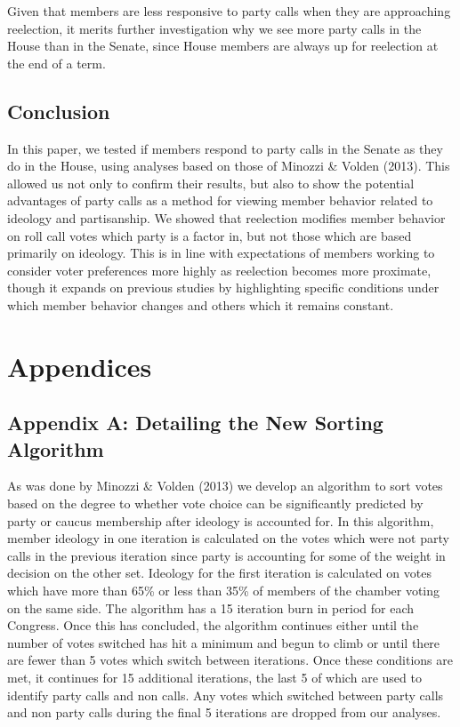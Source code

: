 \documentclass[12pt]{article}
\begin{document}
Given that members are less responsive to party calls when they are approaching reelection, it merits further investigation why we see more party calls in the House than in the Senate, since House members are always up for reelection at the end of a term. 



\subsection{Conclusion}

In this paper, we tested if members respond to party calls in the Senate as they do in the House, using analyses based on those of Minozzi \& Volden (2013). This allowed us not only to confirm their results, but also to show the potential advantages of party calls as a method for viewing member behavior related to ideology and partisanship. We showed that reelection modifies member behavior on roll call votes which party is a factor in, but not those which are based primarily on ideology. This is in line with expectations of members working to consider voter preferences more highly as reelection becomes more proximate, though it expands on previous studies by highlighting specific conditions under which member behavior changes and others which it remains constant.

\pagebreak

\section{Appendices}

\subsection{Appendix A: Detailing the New Sorting Algorithm}

As was done by Minozzi \& Volden (2013) we develop an algorithm to sort votes based on the degree to whether vote choice can be significantly predicted by party or caucus membership after ideology is accounted for. In this algorithm, member ideology in one iteration is calculated on the votes which were not party calls in the previous iteration since party is accounting for some of the weight in decision on the other set. Ideology for the first iteration is calculated on votes which have more than 65\% or less than 35\% of members of the chamber voting on the same side. The algorithm has a 15 iteration burn in period for each Congress. Once this has concluded, the algorithm continues either until the number of votes switched has hit a minimum and begun to climb or until there are fewer than 5 votes which switch between iterations. Once these conditions are met, it continues for 15 additional iterations, the last 5 of which are used to identify party calls and non calls. Any votes which switched between party calls and non party calls during the final 5 iterations are dropped from our analyses.
\end{document}
